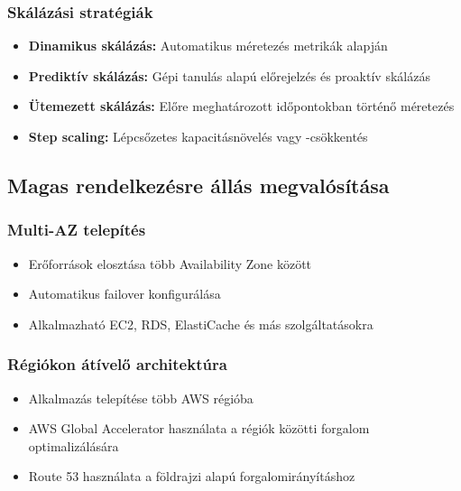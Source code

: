 \documentclass[a4paper,12pt]{article}
\begin{document}
    \subsubsection{Skálázási stratégiák}

    \begin{itemize}
        \item \textbf{Dinamikus skálázás:} Automatikus méretezés metrikák alapján
        \item \textbf{Prediktív skálázás:} Gépi tanulás alapú előrejelzés és proaktív skálázás
        \item \textbf{Ütemezett skálázás:} Előre meghatározott időpontokban történő méretezés
        \item \textbf{Step scaling:} Lépcsőzetes kapacitásnövelés vagy -csökkentés
    \end{itemize}

    \subsection{Magas rendelkezésre állás megvalósítása}

    \subsubsection{Multi-AZ telepítés}

    \begin{itemize}
        \item Erőforrások elosztása több Availability Zone között
        \item Automatikus failover konfigurálása
        \item Alkalmazható EC2, RDS, ElastiCache és más szolgáltatásokra
    \end{itemize}

    \subsubsection{Régiókon átívelő architektúra}

    \begin{itemize}
        \item Alkalmazás telepítése több AWS régióba
        \item AWS Global Accelerator használata a régiók közötti forgalom optimalizálására
        \item Route 53 használata a földrajzi alapú forgalomirányításhoz
    \end{itemize}
\end{document}
